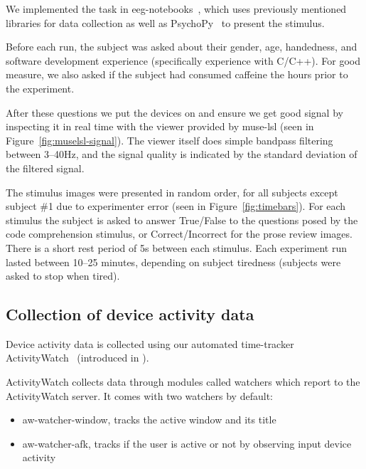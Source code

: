             We implemented the task in eeg-notebooks~\cite{barachant_eeg-notebooks_2020}, which uses previously mentioned libraries for data collection as well as PsychoPy~\cite{peirce_psychopy2_2019} to present the stimulus.

            Before each run, the subject was asked about their gender, age, handedness, and software development experience (specifically experience with C/C++). For good measure, we also asked if the subject had consumed caffeine the hours prior to the experiment.

            After these questions we put the devices on and ensure we get good signal by inspecting it in real time with the viewer provided by muse-lsl (seen in Figure~\ref{fig:muselsl-signal}). The viewer itself does simple bandpass filtering between 3--40Hz, and the signal quality is indicated by the standard deviation of the filtered signal.

            The stimulus images were presented in random order, for all subjects except subject \#1 due to experimenter error (seen in Figure~\ref{fig:timebars}). For each stimulus the subject is asked to answer True/False to the questions posed by the code comprehension stimulus, or Correct/Incorrect for the prose review images. There is a short rest period of 5s between each stimulus. Each experiment run lasted between 10--25 minutes, depending on subject tiredness (subjects were asked to stop when tired).

    \vfill
    \pagebreak
    \subsection{Collection of device activity data}\label{section:collect-usage}

        Device activity data is collected using our automated time-tracker ActivityWatch~\cite{bjareholt_activitywatch_2020} (introduced in ).

        \begin{minipage}{\textwidth}
        ActivityWatch collects data through modules called watchers which report to the ActivityWatch server. It comes with two watchers by default:

        \begin{itemize}
            \item aw-watcher-window, tracks the active window and its title
            \item aw-watcher-afk, tracks if the user is active or not by observing input device activity
        \end{itemize}
        \end{minipage}

